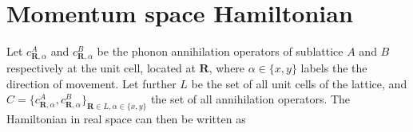 \section*{Momentum space Hamiltonian}
Let $c^A_{\mathbf{R},\alpha}$ and $c^B_{\mathbf{R},\alpha}$ be the phonon annihilation operators of sublattice $A$ and $B$ respectively at the unit cell, located at $\mathbf{R}$, where $\alpha\in\{x,y\}$ labels the the direction of movement. Let further $L$ be the set of all unit cells of the lattice, and $C=\{ c^A_{\mathbf{R},\alpha}, c^B_{\mathbf{R},\alpha} \}_{\mathbf{R}\in L, \alpha\in\{x,y\}}$ the set of all annihilation operators. The Hamiltonian in real space can then be written as
